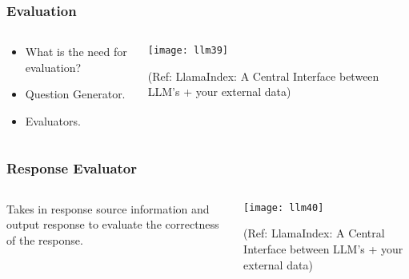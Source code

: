 \begin{frame}[fragile]\frametitle{Evaluation}

\begin{columns}
    \begin{column}[T]{0.4\linewidth}
		\begin{itemize}
		\item What is the need for evaluation?
		\item Question Generator.
		\item Evaluators.
		\end{itemize}	
    \end{column}
    \begin{column}[T]{0.6\linewidth}
		\begin{center}
		\texttt{[image: llm39]}

		{\tiny (Ref: LlamaIndex: A Central Interface between LLM’s + your external data)}
		\end{center}
    \end{column}
  \end{columns}
\end{frame}

\begin{frame}[fragile]\frametitle{Response Evaluator}

\begin{columns}
    \begin{column}[T]{0.4\linewidth}
Takes in response source information and output response to evaluate the correctness of the response.

    \end{column}
    \begin{column}[T]{0.6\linewidth}
		\begin{center}
		\texttt{[image: llm40]}

		{\tiny (Ref: LlamaIndex: A Central Interface between LLM’s + your external data)}
		\end{center}
    \end{column}
  \end{columns}
\end{frame}

